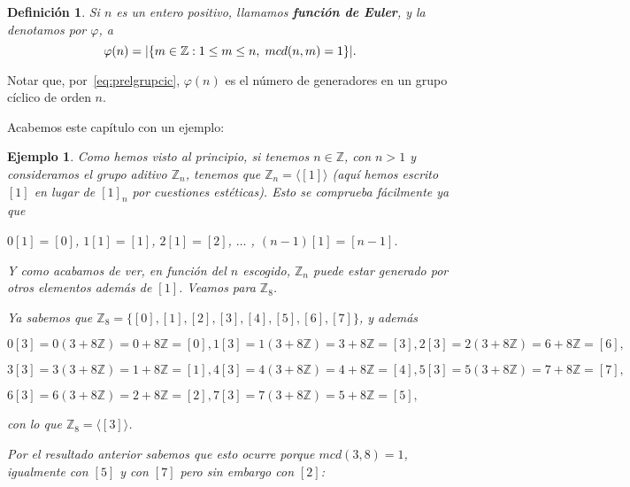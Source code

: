 \documentclass[12pt]{article}
\newtheorem{definition}[theorem]{Definición}
\newtheorem{example}{Ejemplo}[theorem]
\begin{document}
\begin{definition}Si $n$ es un entero positivo, llamamos \textbf{función de Euler}, y la denotamos por $\varphi$, a $$\varphi(n)=| \lbrace m \in \mathbb{Z}:1\leq m \leq n, \hspace{0.1cm} mcd(n,m)=1 \rbrace|.$$
\end{definition}

Notar que, por~\ref{eq:prelgrupcic}, $\varphi(n)$ es el número de generadores en un grupo cíclico de orden $n$.

Acabemos este capítulo con un ejemplo:

\begin{example}Como hemos visto al principio, si tenemos $n \in \mathbb{Z}$, con $n>1$ y consideramos el grupo aditivo $\mathbb{Z}_{n}$, tenemos que $\mathbb{Z}_{n} = \langle \left[ 1 \right] \rangle$ (aquí hemos escrito $\left[ 1 \right]$ en lugar de $\left[ 1 \right]_{n}$ por cuestiones estéticas). Esto se comprueba fácilmente ya que 
\begin{center}
$0\left[ 1 \right] = \left[ 0 \right]$, $1\left[ 1 \right] = \left[ 1 \right]$, $2\left[ 1 \right] = \left[ 2 \right]$, $\ldots$ , $(n-1)\left[ 1 \right] = \left[ n-1 \right].$
\end{center}
Y como acabamos de ver, en función del $n$ escogido, $\mathbb{Z}_{n}$ puede estar generado por otros elementos además de $\left[ 1 \right]$. Veamos para $\mathbb{Z}_{8}$.

Ya sabemos que $\mathbb{Z}_{8} = \lbrace \left[ 0 \right], \left[ 1 \right], \left[ 2 \right], \left[ 3 \right], \left[ 4 \right], \left[ 5 \right], \left[ 6 \right], \left[ 7 \right] \rbrace$, y además

$0\left[ 3 \right] = 0(3 + 8\mathbb{Z}) = 0 +8\mathbb{Z} = \left[ 0 \right],1\left[ 3 \right] = 1(3 + 8\mathbb{Z}) = 3 +8\mathbb{Z} = \left[ 3 \right],2\left[ 3 \right] = 2(3 + 8\mathbb{Z}) = 6 +8\mathbb{Z} = \left[ 6 \right],$

$3\left[ 3 \right] = 3(3 + 8\mathbb{Z}) = 1 +8\mathbb{Z} = \left[ 1 \right],4\left[ 3 \right] = 4(3 + 8\mathbb{Z}) = 4 +8\mathbb{Z} = \left[ 4 \right], 5\left[ 3 \right] = 5(3 + 8\mathbb{Z}) = 7 +8\mathbb{Z} = \left[ 7 \right],$

$6\left[ 3 \right] = 6(3 + 8\mathbb{Z}) = 2 +8\mathbb{Z} = \left[ 2 \right], 7\left[ 3 \right] = 7(3 + 8\mathbb{Z}) = 5 +8\mathbb{Z} = \left[ 5 \right],$

con lo que $\mathbb{Z}_{8} = \langle \left[ 3 \right] \rangle$. 

Por el resultado anterior sabemos que esto ocurre porque $mcd(3,8)=1$, igualmente con $\left[ 5 \right]$ y con $\left[ 7 \right]$ pero sin embargo con $\left[ 2 \right]$:


\end{example}
\end{document}
